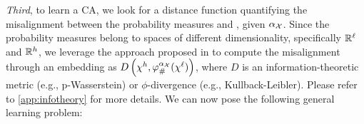\textit{Third}, to learn a CA, we look for a distance function quantifying the misalignment between the probability measures \measurelow and \measurehigh, given $\alpha_{\mathcal{X}}$.
Since the probability measures belong to spaces of different dimensionality, specifically $\mathbb{R}^\ell$ and $\mathbb{R}^h$, we leverage the approach proposed in \cite{cai2022distancesprobabilitydistributionsdifferent} to compute the misalignment through an embedding as $D\left(\chi^{h},\varphi_{\#}^{\alpha_{\mathcal{X}}}(\chi^{\ell})\right)$, where $D$ is an information-theoretic metric (e.g., $\mathrm{p}$-Wasserstein) or $\phi$-divergence (e.g., Kullback-Leibler).
Please refer to \cref{app:infotheory} for more details.
We can now pose the following general learning problem:
\begin{center}
\end{center}


